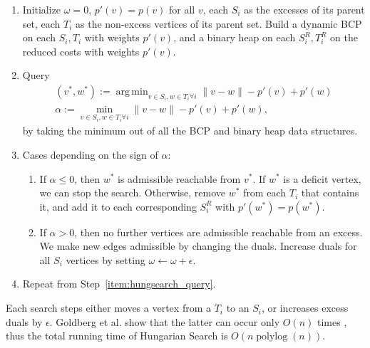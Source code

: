 \documentclass[11pt]{article}
\def\polylog{\mathop{\mathrm{polylog}}}
\DeclareMathOperator*{\argmin}{arg\,min}
\theoremstyle{plain}
\begin{document}
\begin{enumerate}
\item Initialize $\omega = 0$, $p'(v) = p(v)$ for all $v$, 
	each $S_i$ as the excesses of its parent set, each $T_i$ as the non-excess vertices of its parent set.
	Build a dynamic BCP on each $S_i, T_i$ with weights $p'(v)$,
	and a binary heap on each $S^R_i, T^R_i$ on the reduced costs with weights $p'(v)$.
\item \label{item:hungsearch_query}
	Query
	\begin{gather*}
		(v^*, w^*) := \argmin_{v \in S_i, w \in T_i \forall i} \|v - w\| - p'(v) + p'(w) \\
		\alpha := \min_{v \in S_i, w \in T_i \forall i} \|v - w\| - p'(v) + p'(w),
	\end{gather*}
	by taking the minimum out of all the BCP and binary heap data structures.
\item Cases depending on the sign of $\alpha$:
	\begin{enumerate}
	\item If $\alpha \leq 0$, 
		then $w^*$ is admissible reachable from $v^*$.
		If $w^*$ is a deficit vertex, we can stop the search.
		Otherwise, remove $w^*$ from each $T_i$ that contains it,
		and add it to each corresponding $S^R_i$ with $p'(w^*) = p(w^*)$.
	\item If $\alpha > 0$,
		then no further vertices are admissible reachable from an excess.
		We make new edges admissible by changing the duals.
		Increase duals for all $S_i$ vertices by setting 
		$\omega \gets \omega + \epsilon$.
	\end{enumerate}
\item Repeat from Step~\ref{item:hungsearch_query}.
\end{enumerate}

Each search steps either moves a vertex from a $T_i$ to an $S_i$, 
or increases excess duals by $\epsilon$.
Goldberg et al. show that the latter can occur only $O(n)$ times
\cite[Lemma~3.4]{DBLP:journals/mst/GoldbergHKT17},
thus the total running time of Hungarian Search is $O(n\polylog(n))$.
\end{document}
